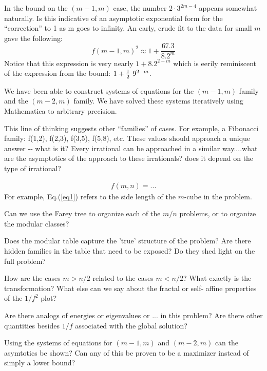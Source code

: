 \documentclass[superscriptaddress,reprint,amsmath,amssymb,aps]{revtex4-1}
\begin{document}
In the bound on the $(m-1,m)$ case, the number $2 \cdot 3^{2m-4}$ appears
somewhat naturally.  Is this indicative of an asymptotic exponential form
for the ``correction'' to 1 as m goes to infinity.  An early, crude fit to
the data for small $m$ gave the following:
\begin{equation*}
f(m-1,m)^2 \approx 1 + \frac{67.3}{8.2^m}
\end{equation*}
Notice that this expression is very nearly $1 + 8.2^{2-m}$ which
is eerily reminiscent of the expression from the bound: $1 + \frac{1}{2}~9^{2-m}$.

We have been able to construct systems of equations for the $(m-1,m)$ family
and the $(m-2,m)$ family.  We have solved these systems iteratively using
Mathematica to arbitrary precision.

This line of thinking suggests other ``families'' of cases.  For example, a
Fibonacci family:  f(1,2), f(2,3), f(3,5), f(5,8), etc.  These values should
approach a unique answer ‐‐ what is it?  Every irrational can be approached
in a similar way....what are the asymptotics of the approach to these
irrationals?  does it depend on the type of irrational?


\begin{align}
f(m,n) = ...
\label{eq1}
\end{align}
For example, Eq.(\ref{eq1}) refers to the side length of the $m$-cube in the
problem.

\vspace{.15in}



Can we use the Farey tree to organize each of the $m/n$ problems, or to
organize the modular classes?

Does the modular table capture the ’true’ structure of the problem?  Are
there hidden families in the table that need to be exposed?  Do they shed
light on the full problem?

How are the cases $m > n/2$ related to the cases $m < n/2$?  What exactly
is the transformation?  What else can we say about the fractal or self‐
affine properties of the $1/f^2$ plot?

Are there analogs of energies or eigenvalues or ... in this problem? Are
there other quantities besides $1/f$ associated with the global solution?

Using the systems of equations for $(m-1,m)$ and $(m-2,m)$ can the asymtotics
be shown?  Can any of this be proven to be a maximizer instead of simply a
lower bound?
\end{document}

